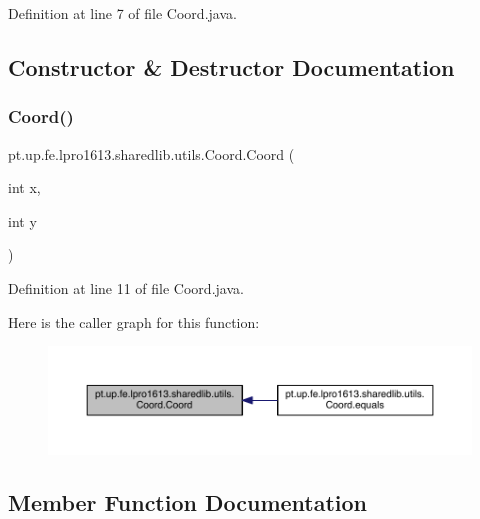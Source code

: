 Definition at line 7 of file Coord.\+java.



\subsection{Constructor \& Destructor Documentation}
\hypertarget{classpt_1_1up_1_1fe_1_1lpro1613_1_1sharedlib_1_1utils_1_1_coord_a43ebef088b4a7b390ac60f7fb4a200bb}{}\label{classpt_1_1up_1_1fe_1_1lpro1613_1_1sharedlib_1_1utils_1_1_coord_a43ebef088b4a7b390ac60f7fb4a200bb} 
\subsubsection{\texorpdfstring{Coord()}{Coord()}}
{\footnotesize\ttfamily pt.\+up.\+fe.\+lpro1613.\+sharedlib.\+utils.\+Coord.\+Coord (\begin{DoxyParamCaption}\item[{int}]{x,  }\item[{int}]{y }\end{DoxyParamCaption})}



Definition at line 11 of file Coord.\+java.

Here is the caller graph for this function\+:
\nopagebreak
\begin{figure}[H]
\begin{center}
\leavevmode
\includegraphics[width=350pt]{classpt_1_1up_1_1fe_1_1lpro1613_1_1sharedlib_1_1utils_1_1_coord_a43ebef088b4a7b390ac60f7fb4a200bb_icgraph}
\end{center}
\end{figure}


\subsection{Member Function Documentation}
\hypertarget{classpt_1_1up_1_1fe_1_1lpro1613_1_1sharedlib_1_1utils_1_1_coord_ab7b6eb36dbf1fe7df81fb9cfedeed2eb}{}\label{classpt_1_1up_1_1fe_1_1lpro1613_1_1sharedlib_1_1utils_1_1_coord_ab7b6eb36dbf1fe7df81fb9cfedeed2eb} 

